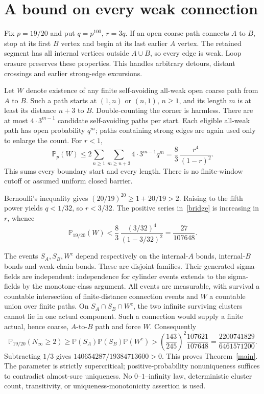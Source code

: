 \documentclass[11pt]{article}
\theoremstyle{definition}
\newcommand{\PP}{\mathbb P}
\begin{document}
\section{A bound on every weak connection}
Fix $p=19/20$ and put $q=p^{100}$, $r=3q$.
If an open coarse path connects $A$ to $B$, stop at its first $B$ vertex
and begin at its last earlier $A$ vertex. The retained segment has all
internal vertices outside $A\cup B$, so every edge is weak.
Loop erasure preserves these properties. This handles arbitrary detours,
distant crossings and earlier strong-edge excursions.

Let $W$ denote existence of any finite self-avoiding all-weak open
coarse path from $A$ to $B$. Such a path starts at $(1,n)$ or $(n,1)$,
$n\geq1$, and its length $m$ is at least its distance $n+3$ to $B$.
Double-counting the corner is harmless. There are at most
$4\cdot3^{m-1}$ candidate self-avoiding paths per start. Each eligible
all-weak path has open probability $q^m$; paths containing strong edges
are again used only to enlarge the count. For $r<1$,
\begin{equation}\label{bridge}
 \PP_p(W)\leq
 2\sum_{n\geq1}\sum_{m\geq n+3}4\cdot3^{m-1}q^m
 =\frac83\,\frac{r^4}{(1-r)^2}.
\end{equation}
This sums every boundary start and every length. There is no finite-window
cutoff or assumed uniform closed barrier.

Bernoulli's inequality gives
$(20/19)^{20}\geq1+20/19>2$.
Raising to the fifth power yields $q<1/32$, so $r<3/32$.
The positive series in~\eqref{bridge} is increasing in $r$, whence
\begin{equation}\label{weakbound}
 \PP_{19/20}(W)<
 \frac83\,\frac{(3/32)^4}{(1-3/32)^2}
 =\frac{27}{107648}.
\end{equation}

The events $S_A,S_B,W^c$ depend respectively on the internal-$A$ bonds,
internal-$B$ bonds and weak-chain bonds. These are disjoint families.
Their generated sigma-fields are independent: independence for cylinder
events extends to the sigma-fields by the monotone-class argument.
All events are measurable, with survival a countable intersection of
finite-distance connection events and $W$ a countable union over finite paths.
On $S_A\cap S_B\cap W^c$, the two infinite surviving clusters cannot lie
in one actual component. Such a connection would supply a finite actual,
hence coarse, $A$-to-$B$ path and force $W$.
Consequently
\[
 \PP_{19/20}(N_\infty\geq2)
 \geq \PP(S_A)\PP(S_B)\PP(W^c)
 >\left(\frac{143}{245}\right)^2\frac{107621}{107648}
 =\frac{2200741829}{6461571200}.
\]
Subtracting $1/3$ gives $140654287/19384713600>0$.
This proves Theorem~\ref{main}. The parameter is strictly supercritical;
positive-probability nonuniqueness suffices to contradict almost-sure
uniqueness. No $0$--$1$--infinity law, deterministic cluster count,
transitivity, or uniqueness-monotonicity assertion is used.
\end{document}
